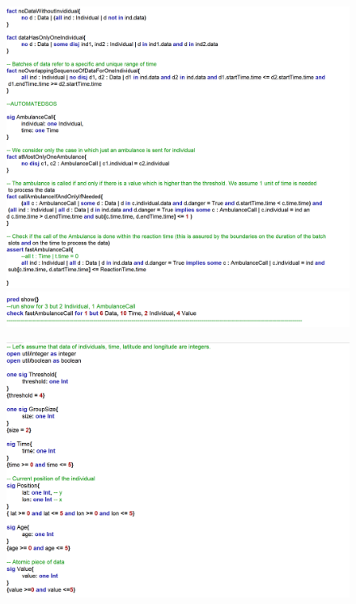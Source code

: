 \documentclass{article}
\begin{document}
\begin{legal}
\begin{figure}[H]
		\end{figure}
		\begin{figure}[H]
			\includegraphics[width=\linewidth]{./images/alloy/code/automated_2.PNG}
			\includegraphics[width=\linewidth]{./images/alloy/code/automated_3.PNG}
		\end{figure}
		\begin{figure}[H]
			\newpage
			\includegraphics[width=\linewidth]{./images/alloy/code/data4Help_1.PNG}

\end{figure}
\end{legal}
\end{document}
